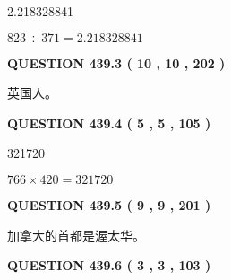 \documentclass{ctexart}
\begin{document}
  
 
 
\noindent{}

2.218328841
 
 
 
 
\noindent{}

$ %
823 \div  %
371=   %
2.218328841$
 
 
  
\vspace{0.2in}
  
{\textbf{\Large{QUESTION
439.3 
 ( 10 , 10 , 202 )
}}}
  
  
 
 
\noindent{}
 
 
英国人。
 
 
 
 
  
\vspace{0.2in}
  
{\textbf{\Large{QUESTION
439.4 
 ( 5 , 5 , 105 )
}}}
  
  
 
 
\noindent{}

321720
 
 
 
 
\noindent{}

$ %
766 \times  %
420=   %
321720$
 
 
  
\vspace{0.2in}
  
{\textbf{\Large{QUESTION
439.5 
 ( 9 , 9 , 201 )
}}}
  
  
 
 
\noindent{}
 
 
加拿大的首都是渥太华。
 
 
 
 
  
\vspace{0.2in}
  
{\textbf{\Large{QUESTION
439.6 
 ( 3 , 3 , 103 )
}}}
  
  
 
\end{document}
